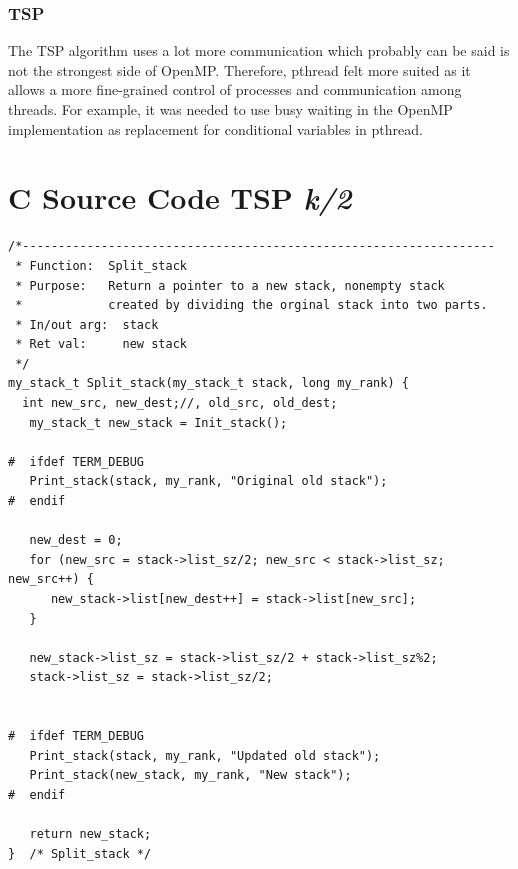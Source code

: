 \documentclass[a4paper,11pt,twoside]{article}
\begin{document}
\subsubsection{TSP}
The TSP algorithm uses a lot more communication which probably can be said is not the strongest side of OpenMP. Therefore, pthread felt more suited as it allows a more fine-grained control of processes and communication among threads. For example, it was needed to use busy waiting in the OpenMP implementation as replacement for conditional variables in pthread.



\appendix
\section{C Source Code TSP \textit{k/2}}{\label{app:k2}}
\begin{verbatim}
/*------------------------------------------------------------------
 * Function:  Split_stack
 * Purpose:   Return a pointer to a new stack, nonempty stack
 *            created by dividing the orginal stack into two parts.
 * In/out arg:  stack
 * Ret val:     new stack
 */
my_stack_t Split_stack(my_stack_t stack, long my_rank) {
  int new_src, new_dest;//, old_src, old_dest;
   my_stack_t new_stack = Init_stack();

#  ifdef TERM_DEBUG
   Print_stack(stack, my_rank, "Original old stack");
#  endif

   new_dest = 0;
   for (new_src = stack->list_sz/2; new_src < stack->list_sz; new_src++) {
      new_stack->list[new_dest++] = stack->list[new_src];
   }

   new_stack->list_sz = stack->list_sz/2 + stack->list_sz%2;
   stack->list_sz = stack->list_sz/2;
   

#  ifdef TERM_DEBUG
   Print_stack(stack, my_rank, "Updated old stack");
   Print_stack(new_stack, my_rank, "New stack");
#  endif

   return new_stack;
}  /* Split_stack */
\end{verbatim}
\end{document}
